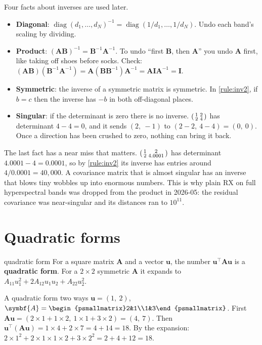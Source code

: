 \documentclass[11pt,a4paper,oneside,openany]{book}
\newcommand{\B}[1]{{\symbf{#1}}}
\newcommand{\B}[1]{{\bm{#1}}}
\newcommand{\T}{^{\top}}
\newcommand{\vu}{\B{u}}
\newcommand{\mI}{\B{I}}
\newcommand{\mA}{\B{A}}
\newcommand{\mB}{\B{B}}
\begin{document}
Four facts about inverses are used later.
\begin{itemize}
\item \textbf{Diagonal}: $\operatorname{diag}(d_1,\dots,d_N)^{-1}=\operatorname{diag}(1/d_1,\dots,1/d_N)$. Undo each band's
  scaling by dividing.
\item \textbf{Product}: $(\mA\mB)^{-1}=\mB^{-1}\mA^{-1}$. To undo ``first $\mB$, then $\mA$'' you undo $\mA$ first, like
  taking off shoes before socks. Check: $(\mA\mB)(\mB^{-1}\mA^{-1})=\mA(\mB\mB^{-1})\mA^{-1}=\mA\mI\mA^{-1}=\mI$.
\item \textbf{Symmetric}: the inverse of a symmetric matrix is symmetric. In \cref{rule:inv2}, if $b=c$ then the inverse has
  $-b$ in both off-diagonal places.
\item \textbf{Singular}: if the determinant is zero there is no inverse. $\begin{psmallmatrix}1&2\\2&4\end{psmallmatrix}$ has
  determinant $4-4=0$, and it sends $(2,\ -1)$ to $(2-2,\ 4-4)=(0,\ 0)$. Once a direction has been crushed to zero, nothing
  can bring it back.
\end{itemize}

The last fact has a near miss that matters. $\begin{psmallmatrix}1&2\\2&4.0001\end{psmallmatrix}$ has determinant
$4.0001-4=0.0001$, so by \cref{rule:inv2} its inverse has entries around $4/0.0001=40{,}000$. A covariance matrix that is almost
singular has an inverse that blows tiny wobbles up into enormous numbers. This is why plain RX on full hyperspectral bands
was dropped from the product in 2026-05: the residual covariance was near-singular and its distances ran to $10^{11}$.

\section{Quadratic forms}

\begin{defn}{quadratic form}
For a square matrix $\mA$ and a vector $\vu$, the number $\vu\T\mA\vu$ is a \textbf{quadratic form}. For a $2\times2$ symmetric
$\mA$ it expands to $A_{11}u_1^2+2A_{12}u_1u_2+A_{22}u_2^2$.
\end{defn}

\begin{worked}[label=we:quad]{A quadratic form two ways}
$\vu=(1,\ 2)$, $\mA=\begin{psmallmatrix}2&1\\1&3\end{psmallmatrix}$. First $\mA\vu=(2\times1+1\times2,\ 1\times1+3\times2)=(4,\ 7)$.
Then $\vu\T(\mA\vu)=1\times4+2\times7=4+14=18$. By the expansion:
$2\times1^2+2\times1\times1\times2+3\times2^2=2+4+12=18$.
\end{worked}
\end{document}
